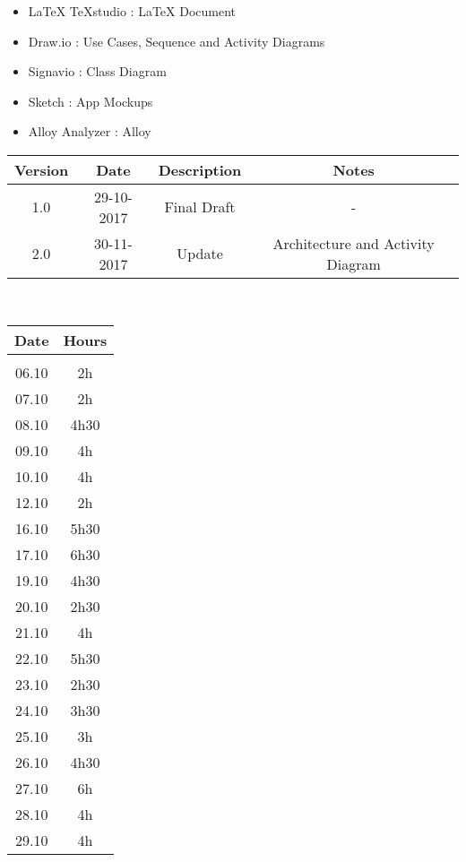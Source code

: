 \begin{itemize}
	\setlength{\leftskip}{1cm}
	\item LaTeX TeXstudio : LaTeX Document
	\item Draw.io : Use Cases, Sequence and Activity Diagrams
	\item Signavio : Class Diagram
	\item Sketch : App Mockups
	\item Alloy Analyzer : Alloy
\end{itemize}

\vspace{0.5cm}
\begin{tabular}[H]{c|c|c|c}
	Version & Date & Description & Notes\\
	\hline
	\rule{0pt}{4ex}1.0	&	29-10-2017	&	Final Draft	&	-\\
	\rule{0pt}{4ex}2.0	&	30-11-2017	&	Update	&	Architecture and Activity Diagram
\end{tabular}
\vspace{0.5cm}\\

\vspace{0.5cm}
\begin{tabular}[H]{cc}
	Date & Hours\\
	\hline\\
	06.10	&	2h\\
	07.10	&	2h\\
	08.10	&	4h30\\
	09.10	&	4h\\
	10.10	&	4h\\
	12.10	&	2h\\
	16.10	&	5h30\\
	17.10	&	6h30\\
	19.10	&	4h30\\
	20.10	&	2h30\\
	21.10	&	4h\\
	22.10	&	5h30\\
	23.10	&	2h30\\
	24.10	&	3h30\\
	25.10	&	3h\\
	26.10	&	4h30\\
	27.10	&	6h\\
	28.10	&	4h\\
	29.10	&	4h
\end{tabular}

